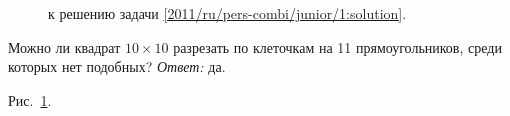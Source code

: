 \ifsolution
\begin{figure}\centering
    \caption{к решению задачи \ref{2011/ru/pers-combi/junior/1:solution}.}
    \label{2011/ru/pers-combi/junior/1:solution:fig}
\end{figure}%
\fi %

\problem
Можно ли квадрат $10 \times 10$ разрезать по клеточкам на 11 прямоугольников,
среди которых нет подобных?
\solution
\label{2011/ru/pers-combi/junior/1:solution}%
\emph{Ответ:} да.
\par
Рис.~\ref{2011/ru/pers-combi/junior/1:solution:fig}.
\endproblem
